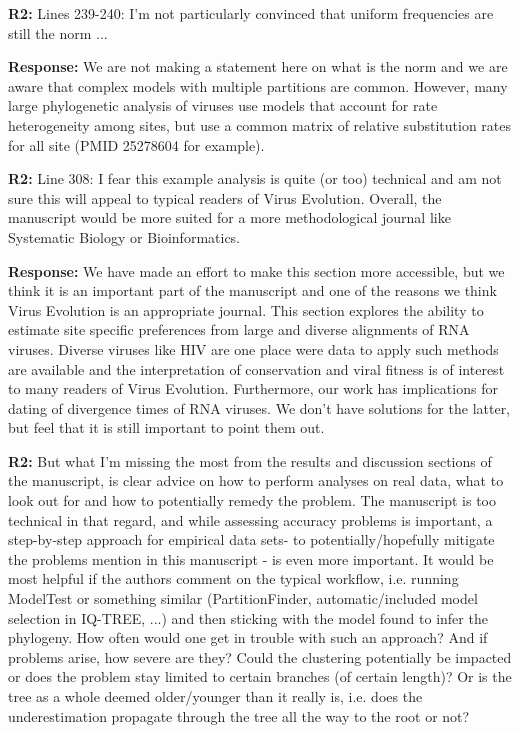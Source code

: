 \documentclass[aps,rmp,onecolumn]{revtex4-1}
\newcommand{\refb}[1]{\textbf{R2:} #1}
\newcommand{\response}[1]{{\color{black}\textbf{Response:} #1}}
\begin{document}
\refb{Lines 239-240: I’m not particularly convinced that uniform frequencies are still the norm ...}

\response{We are not making a statement here on what is the norm and we are aware that complex models with multiple partitions are common. However, many large phylogenetic analysis of viruses use models that account for rate heterogeneity among sites, but use a common matrix of relative substitution rates for all site (PMID 25278604 for example). }

\refb{Line 308: I fear this example analysis is quite (or too) technical and am not sure this will appeal to typical readers of Virus Evolution. Overall, the manuscript would be more suited for a more methodological journal like Systematic Biology or Bioinformatics.}

\response{We have made an effort to make this section more accessible, but we think it is an important part of the manuscript and one of the reasons we think Virus Evolution is an appropriate journal.
This section explores the ability to estimate site specific preferences from large and diverse alignments of RNA viruses.
Diverse viruses like HIV are one place were data to apply such methods are available and the interpretation of conservation and viral fitness is of interest to many readers of Virus Evolution.
Furthermore, our work has implications for dating of divergence times of RNA viruses.
We don't have solutions for the latter, but feel that it is still important to point them out.
}


\refb{But what I’m missing the most from the results and discussion sections of the manuscript, is clear advice on how to perform analyses on real data, what to look out for and how to potentially remedy the problem. The manuscript is too technical in that regard, and while assessing accuracy problems is important, a step-by-step approach for empirical data sets- to potentially/hopefully mitigate the problems mention in this manuscript - is even more important. It would be most helpful if the authors comment on the typical workflow, i.e. running ModelTest or something similar (PartitionFinder, automatic/included model selection in IQ-TREE, ...) and then sticking with the model found to infer the phylogeny. How often would one get in trouble with such an approach? And if problems arise, how severe are they? Could the clustering potentially be impacted or does the problem stay limited to certain branches (of certain length)? Or is the tree as a whole deemed older/younger than it really is, i.e. does the underestimation propagate through the tree all the way to the root or not?}
\end{document}
